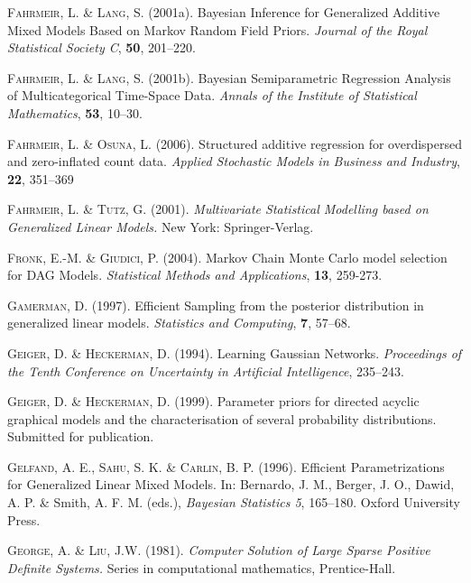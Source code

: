 \begin{thebibliography}{99}
 {\scshape Fahrmeir, L. \& Lang, S.} (2001a).
 Bayesian Inference for Generalized Additive Mixed Models Based on Markov Random Field Priors.
 {\it Journal of the Royal Statistical Society C}, {\bf 50}, 201--220.

 {\scshape Fahrmeir, L. \& Lang, S.} (2001b).
 Bayesian Semiparametric Regression Analysis of Multicategorical Time-Space Data.
 {\it Annals of the Institute of Statistical Mathematics}, {\bf 53}, 10--30.

 {\scshape Fahrmeir, L. \& Osuna, L.} (2006).
 Structured additive regression for overdispersed and zero-inflated count data.
 {\it Applied Stochastic Models in Business and Industry}, {\bf 22}, 351--369

 {\scshape Fahrmeir, L. \& Tutz, G.} (2001).
 {\it Multivariate Statistical Modelling based on Generalized Linear Models.}
 New York: Springer-Verlag.

 {\scshape Fronk, E.-M. \& Giudici, P.} (2004).
 Markov Chain Monte Carlo model selection for DAG Models.
 {\it Statistical Methods and Applications}, {\bf 13}, 259-273.

 {\scshape Gamerman, D.} (1997).
 Efficient Sampling from the posterior distribution in generalized linear models.
 {\it Statistics and Computing}, {\bf 7}, 57--68.

 {\scshape Geiger, D. \& Heckerman, D.} (1994).
 Learning Gaussian Networks.
 {\it Proceedings of the Tenth Conference on Uncertainty in Artificial Intelligence}, 235--243.

 {\scshape Geiger, D. \& Heckerman, D.} (1999).
 Parameter priors for directed acyclic graphical models and the characterisation of several probability distributions.
 Submitted for publication.

 {\scshape Gelfand, A. E., Sahu, S. K. \& Carlin, B. P.} (1996).
 Efficient Parametrizations for Genera\-lized Linear Mixed Models.
 In: Bernardo, J. M., Berger, J. O., Dawid, A. P. \& Smith, A. F. M. (eds.),
 {\it Bayesian Statistics 5}, 165--180.
 Oxford University Press.

 {\scshape George, A. \& Liu, J.W.} (1981).
 {\it Computer Solution of Large Sparse Positive Definite Systems.}
 Series in computational mathematics, Prentice-Hall.


\end{thebibliography}
